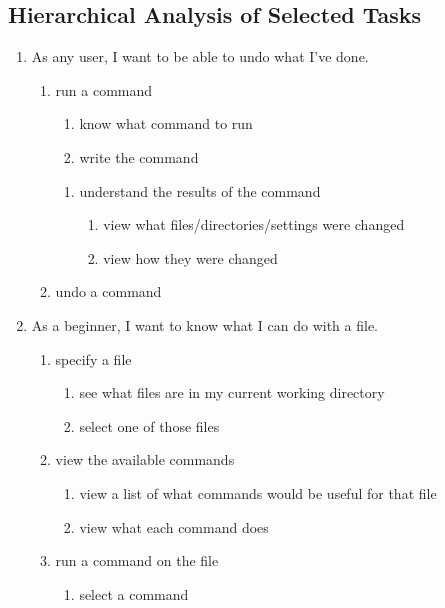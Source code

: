 \subsection{Hierarchical Analysis of Selected Tasks}
\begin{enumerate}
  \item As any user, I want to be able to undo what I’ve done.
  \begin{enumerate}
    \item run a command
    \begin{enumerate}
      \item know what command to run
      \item write the command
    \end{enumerate}
    \begin{enumerate}
      \item understand the results of the command
      \begin{enumerate}
        \item view what files/directories/settings were changed
        \item view how they were changed
      \end{enumerate}
    \end{enumerate}
    \item undo a command
  \end{enumerate}

  \item As a beginner, I want to know what I can do with a file.
  \begin{enumerate}
    \item specify a file
    \begin{enumerate}
      \item see what files are in my current working directory
      \item select one of those files
    \end{enumerate}
    \item view the available commands
    \begin{enumerate}
      \item view a list of what commands would be useful for that file
      \item view what each command does
    \end{enumerate}
    \item run a command on the file
    \begin{enumerate}
      \item select a command
    \end{enumerate}
  \end{enumerate}


\end{enumerate}
